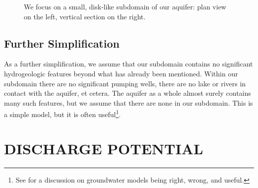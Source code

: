 \documentclass[12pt]{report}
\begin{document}
\begin{figure}[h]
\begin{center}
    \caption{We focus on a small, disk-like subdomain of our aquifer: plan view on the left, vertical section on the right.}
    \label{1.2.1}
\end{center}
\end{figure}


\section{Further Simplification}\label{1.3.1}
As a further simplification, we assume that our subdomain contains no significant hydrogeologic features beyond what has already been mentioned. Within our subdomain there are no significant pumping wells, there are no lake or rivers in contact with the aquifer, et cetera.  The aquifer as a whole almost surely contains many such features, but we assume that there are none in our subdomain. This is a simple model, but it is often useful\footnote{See \citet{Bakker2013} for a discussion on groundwater models being right, wrong, and useful.}.



\chapter{DISCHARGE POTENTIAL}
\end{document}
